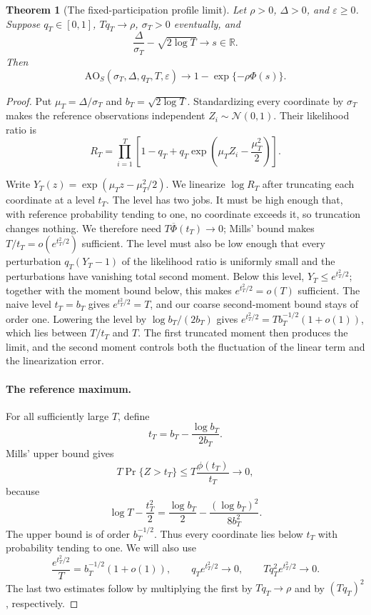 \documentclass[11pt]{article}
\newtheorem{theorem}{Theorem}[section]
\theoremstyle{remark}
\newcommand{\R}{\mathbb R}
\newcommand{\Normal}{\mathcal N}
\newcommand{\AO}{\mathrm{AO}}
\begin{document}
\begin{theorem}[The fixed-participation profile limit]\label{thm:accountant-limit}
Let $\rho>0$, $\Delta>0$, and $\varepsilon\geq0$. Suppose
$q_T\in[0,1]$, $Tq_T\to\rho$, $\sigma_T>0$ eventually, and
\[
 \frac{\Delta}{\sigma_T}-\sqrt{2\log T}\longrightarrow s\in\R.
\]
Then
\[
 \AO_S(\sigma_T,\Delta,q_T,T,\varepsilon)
 \longrightarrow1-\exp\{-\rho\Phi(s)\}.
\]
\end{theorem}

\begin{proof}
Put $\mu_T=\Delta/\sigma_T$ and $b_T=\sqrt{2\log T}$. Standardizing every
coordinate by $\sigma_T$ makes the reference observations independent
$Z_i\sim\Normal(0,1)$. Their likelihood ratio is
\begin{equation}\label{eq:sparse-likelihood-ratio}
 R_T=\prod_{i=1}^T
 \left[1-q_T+q_T\exp\left(\mu_TZ_i-\frac{\mu_T^2}{2}\right)\right].
\end{equation}

Write $Y_T(z)=\exp(\mu_Tz-\mu_T^2/2)$. We linearize $\log R_T$ after
truncating each coordinate at a level $t_T$.
The level has two jobs. It must be high enough that, with reference
probability tending to one, no coordinate exceeds it, so truncation changes
nothing. We therefore need $T\overline\Phi(t_T)\to0$; Mills' bound makes
$T/t_T=o(e^{t_T^2/2})$ sufficient. The level must also be low enough that every
perturbation $q_T(Y_T-1)$ of the likelihood ratio is uniformly small and the
perturbations have vanishing total second moment. Below this level,
$Y_T\leq e^{t_T^2/2}$; together with the moment bound below, this makes
$e^{t_T^2/2}=o(T)$ sufficient. The naive level $t_T=b_T$ gives
$e^{t_T^2/2}=T$, and our coarse second-moment bound stays of order one.
Lowering the level by $\log b_T/(2b_T)$ gives
$e^{t_T^2/2}=Tb_T^{-1/2}(1+o(1))$, which lies between $T/t_T$ and $T$. The first
truncated moment then produces the limit, and the second moment controls both
the fluctuation of the linear term and the linearization error.

\paragraph{The reference maximum.}
For all sufficiently large $T$, define
\[
 t_T=b_T-\frac{\log b_T}{2b_T}.
\]
Mills' upper bound gives
\[
 T\Pr\{Z>t_T\}\leq T\frac{\phi(t_T)}{t_T}\longrightarrow0,
\]
because
\[
 \log T-\frac{t_T^2}{2}
 =\frac{\log b_T}{2}-\frac{(\log b_T)^2}{8b_T^2}.
\]
The upper bound is of order $b_T^{-1/2}$. Thus every coordinate lies below
$t_T$ with probability tending to one. We will also use
\begin{equation}\label{eq:truncation-scales}
 \frac{e^{t_T^2/2}}{T}=b_T^{-1/2}(1+o(1)),\qquad
 q_Te^{t_T^2/2}\to0,\qquad Tq_T^2e^{t_T^2/2}\to0.
\end{equation}
The last two estimates follow by multiplying the first by $Tq_T\to\rho$
and by $(Tq_T)^2$, respectively.


\end{proof}
\end{document}
